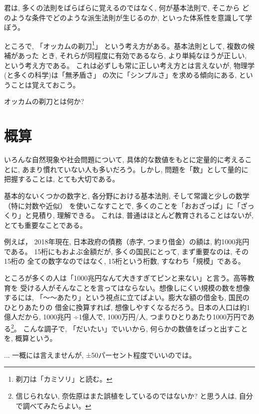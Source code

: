 君は, 多くの法則をばらばらに覚えるのではなく, 何が基本法則で, そこから
どのような条件でどのような派生法則が生じるのか, といった体系性を意識して学ぼう。\mv

ところで, 「オッカムの剃刀\footnote{剃刀は「カミソリ」と読む。}」
という考え方がある。基本法則として, 複数の候補があった
とき, それらが同程度に有効であるなら, より単純なほうが正しい, という考え方である。
これは必ずしも常に正しい考え方とは言えないが, 物理学(と多くの科学)は「無矛盾さ」
の次に「シンプルさ」を求める傾向にある, ということは覚えておこう。\mv

\begin{q}\label{q:OccamsRazor}
オッカムの剃刀とは何か?
\end{q}
\hv



\section{概算}
いろんな自然現象や社会問題について, 具体的な数値をもとに定量的に考えることに, 
あまり慣れていない人も多いだろう。しかし, 問題を「数」として量的に把握することは, 
とても大切である。\mv

基本的ないくつかの数字と, 各分野における基本法則, そして常識と少しの数学（特に対数や近似）
を使いこなすことで, 多くのことを「おおざっぱ」に「ざっくり」と見積り, 理解できる。
これは, 普通はほとんど教育されることはないが, とても重要なことである。\mv

例えば， 2018年現在, 日本政府の債務（赤字, つまり借金）の額は, 約1000兆円である。
15桁にもおよぶ金額だが, 多くの国民にとって, まず重要なのは, その15桁の
全ての数字なのではなく, 15桁という桁数, すなわち「規模」である。

ところが多くの人は「1000兆円なんて大きすぎてピンと来ない」と言う。高等教育を
受ける人がそんなことを言ってはならない。想像しにくい規模の数を想像するには, 
「〜〜あたり」という視点に立てばよい。膨大な額の借金も, 国民のひとりあたりの
借金に換算すれば, 想像しやすくなるだろう。日本の人口は約1億人だから, 1000兆円
÷1億人で, 1000万円/人, つまりひとりあたり1000万円である\footnote{信じられない, 
奈佐原はまた誤植をしているのではないか? と思う人は, 自分で調べてみたらよい。}。
こんな調子で, 「だいたい」でいいから, 何らかの数値をぱっと出すことを, 
概算という。

\begin{faq}{\small{}
... 一概には言えませんが, ±50パーセント程度でいいのでは。}\end{faq}\mv

